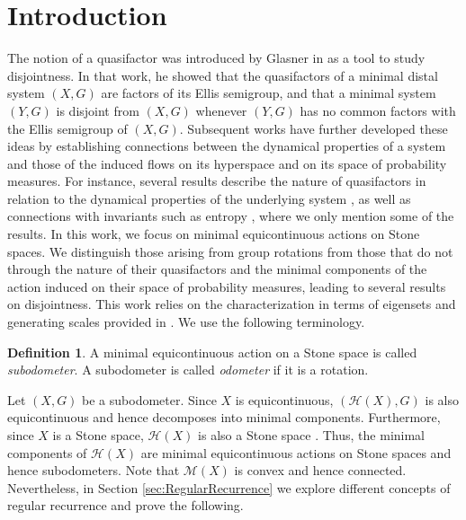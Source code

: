 \documentclass[12pt, reqno]{amsart}
\theoremstyle{definition}
\newtheorem{definition}[theorem]{Definition}
\theoremstyle{remark}
\numberwithin{equation}{section}
\theoremstyle{theorem}
\theoremstyle{remark}
\def\hyper{{\mathcal{H}}}
\begin{document}








\section{Introduction}
The notion of a quasifactor was introduced by Glasner in \cite{glasner1975compressibility} as a tool to study disjointness. In that work, he showed that the quasifactors of a minimal distal system $(X,G)$ are factors of its Ellis semigroup, and that a minimal system $(Y,G)$ is disjoint from $(X,G)$ whenever $(Y,G)$ has no common factors with the Ellis semigroup of $(X,G)$. Subsequent works have further developed these ideas by establishing connections between the dynamical properties of a system and those of the induced flows on its hyperspace and on its space of probability measures. For instance, several results describe the nature of quasifactors in relation to the dynamical properties of the underlying system \cite{auslander2000ellis,glasner2000quasifactors,nagar2022characterization,vanderWoude1979disjointness}, as well as connections with invariants such as entropy \cite{glasner1995quasifactors, kwietniak2007topological}, where we only mention some of the results. 
In this work, we focus on minimal equicontinuous actions on Stone spaces.
We distinguish those arising from group rotations from those that do not through the nature of their quasifactors and the minimal components of the action induced on their space of probability measures, leading to several results on disjointness. This work relies on the characterization in terms of eigensets and generating scales provided in \cite{cortez2026minimal}. We use the following terminology.

\begin{definition}
    A minimal equicontinuous action on a Stone space is called \emph{subodometer}. 
    A subodometer is called \emph{odometer} if it is a rotation. 
\end{definition}

Let $(X,G)$ be a subodometer. 
Since $X$ is equicontinuous, $(\hyper(X),G)$ is also equicontinuous and hence decomposes into minimal components. 
Furthermore, since $X$ is a Stone space, $\hyper(X)$ is also a Stone space \cite[Proposition 8.6]{illanes1999hyperspaces}. Thus, the minimal components of $\hyper(X)$ are minimal equicontinuous actions on Stone spaces and hence subodometers.
Note that $\mathcal{M}(X)$ is convex and hence connected. 
Nevertheless, in Section \ref{sec:RegularRecurrence} we explore different concepts of regular recurrence and prove the following. 
\end{document}
